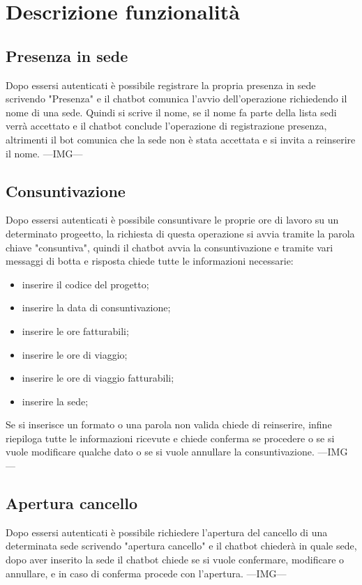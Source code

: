 \section{Descrizione funzionalità}
\subsection{Presenza in sede}
Dopo essersi autenticati è possibile registrare la propria presenza in sede scrivendo "Presenza" e il chatbot comunica l'avvio dell'operazione richiedendo il nome di una sede. 
Quindi si scrive il nome, se il nome fa parte della lista sedi verrà accettato e il chatbot conclude l'operazione di registrazione presenza, altrimenti il bot comunica che la sede non è stata accettata e si invita a reinserire il nome. ---IMG--- \newline

\subsection{Consuntivazione}
Dopo essersi autenticati è possibile consuntivare le proprie ore di lavoro su un determinato progeetto, la richiesta di questa operazione si avvia tramite la parola chiave "consuntiva", quindi il chatbot avvia la consuntivazione e tramite vari messaggi di botta e risposta chiede tutte le informazioni necessarie:
\begin{itemize}
    \item inserire il codice del progetto;
    \item inserire la data di consuntivazione;
    \item inserire le ore fatturabili;
    \item inserire le ore di viaggio;
    \item inserire le ore di viaggio fatturabili;
    \item inserire la sede;
\end{itemize}
Se si inserisce un formato o una parola non valida chiede di reinserire, infine riepiloga tutte le informazioni ricevute e chiede conferma se procedere o se si vuole modificare qualche dato o se si vuole annullare la consuntivazione. ---IMG---

\subsection{Apertura cancello}
Dopo essersi autenticati è possibile richiedere l'apertura del cancello di una determinata sede scrivendo "apertura cancello" e il chatbot chiederà in quale sede, dopo aver inserito la sede il chatbot chiede se si vuole confermare, modificare o annullare, e in caso di conferma procede con l'apertura. ---IMG--- 
\newpage
